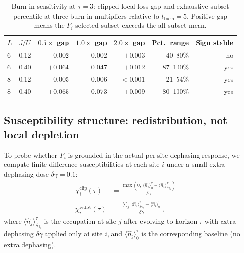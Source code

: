 \documentclass[aps,pra,reprint,amsmath,amssymb,longbibliography,floatfix]{revtex4-2}
\newcommand{\Fi}{F_i}
\newcommand{\nop}{\hat{n}}
\begin{document}
\begin{table}[tbp]
\centering
\caption{Burn-in sensitivity at $\tau=3$: clipped local-loss gap and
exhaustive-subset percentile at three burn-in multipliers relative to
$t_{\mathrm{burn}}=5$.
Positive gap means the $\Fi$-selected subset exceeds the all-subset mean.}
\label{tab:burnin}
\begin{ruledtabular}
\begin{tabular}{llrrrrr}
$L$ & $J/U$ & $0.5\times$ gap & $1.0\times$ gap & $2.0\times$ gap & Pct.\ range & Sign stable \\
\hline
6 & 0.12 & $-0.002$ & $-0.002$ & $+0.003$ & 40--80\% & no \\
6 & 0.40 & $+0.064$ & $+0.047$ & $+0.012$ & 87--100\% & yes \\
8 & 0.12 & $-0.005$ & $-0.006$ & $<0.001$ & 21--54\% & yes \\
8 & 0.40 & $+0.065$ & $+0.073$ & $+0.009$ & 80--100\% & yes \\
\end{tabular}
\end{ruledtabular}
\end{table}

\subsection{Susceptibility structure: redistribution, not local depletion}
\label{sec:susceptibility}

To probe whether $\Fi$ is grounded in the actual per-site dephasing response,
we compute finite-difference susceptibilities at each site $i$ under a small
extra dephasing dose $\delta\gamma=0.1$:
\begin{align}
\chi^{\mathrm{clip}}_i(\tau)   &= \frac{\max(0,\,\langle\nop_i\rangle_0^\tau - \langle\nop_i\rangle_{\delta\gamma_i}^\tau)}{\delta\gamma}, \\
\chi^{\mathrm{redist}}_i(\tau) &= \frac{\sum_j|\langle\nop_j\rangle_{\delta\gamma_i}^\tau - \langle\nop_j\rangle_0^\tau|}{\delta\gamma},
\end{align}
where $\langle\nop_j\rangle_{\delta\gamma_i}^\tau$ is the occupation at site
$j$ after evolving to horizon $\tau$ with extra dephasing $\delta\gamma$
applied only at site $i$, and $\langle\nop_j\rangle_0^\tau$ is the
corresponding baseline (no extra dephasing).
\end{document}

